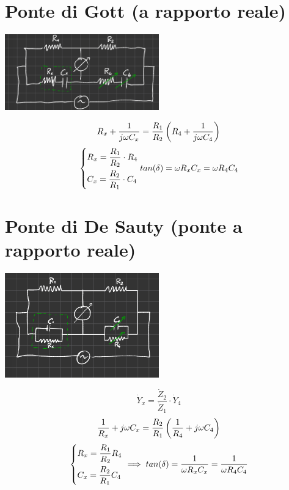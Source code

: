 \section{Ponte di Gott (a rapporto reale)}
  \begin{center}
    \includegraphics[width=0.50\textwidth]{Images/figure32.png}
  \end{center}
\begin{equation*}
    R_x + \frac{1}{j \omega C_x} = \frac{R_1}{R_2} \left(R_4 + \frac{1}{j\omega C_4}\right)
\end{equation*}
\begin{equation*}
    \begin{dcases}
        R_x = \frac{R_1}{R_2} \cdot R_4\\
        C_x = \frac{R_2}{R_1} \cdot C_4
    \end{dcases}
    tan(\delta) = \omega R_x C_x = \omega R_4 C_4
\end{equation*}
\section{Ponte di De Sauty (ponte a rapporto reale)}
  \begin{center}
    \includegraphics[width=0.50\textwidth]{Images/figure33.png}
  \end{center}
\begin{equation*}
    \dot{Y}_x = \frac{\dot{Z}_2}{\dot{Z}_1}\cdot \dot{Y}_4
\end{equation*}
\begin{equation*}
    \frac{1}{R_x} + j\omega C_x = \frac{R_2}{R_1} \left(\frac{1}{R_4} + j \omega C_4\right)
\end{equation*}
\begin{equation*}
    \begin{dcases}
        R_x = \frac{R_1}{R_2} R_4\\
        C_x = \frac{R_2}{R_1} C_4
    \end{dcases}
    \implies tan(\delta) = \frac{1}{\omega R_x C_x} = \frac{1}{\omega R_4 C_4}
\end{equation*}
